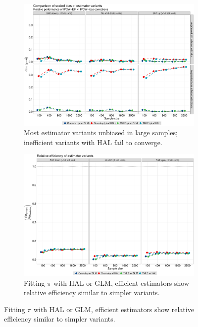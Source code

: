 \documentclass[landscape,a0paper,fontscale=0.285]{baposter} %
\begin{document}
\begin{poster}
{\vspace{-1.25em}
\begin{figure}[H]\label{fig:sim_results}
  \begin{subfigure}[b]{0.48\textwidth}
    \centering
    \includegraphics[scale=0.16]{bias_scaled}
    \caption{Most estimator variants unbiased in large samples; inefficient
      variants with HAL fail to converge.}
    \label{fig:bias}
  \end{subfigure}%
  \hspace{1.5em}
  \begin{subfigure}[b]{0.48\textwidth}
    \centering
    \includegraphics[scale=0.16]{rel_eff}
    \caption{Fitting $\pi$ with HAL or GLM, efficient estimators show
      relative efficiency similar to simpler variants.}
    \label{fig:efficiency}
  \end{subfigure}
\end{figure}
}


\end{poster}
\end{document}
